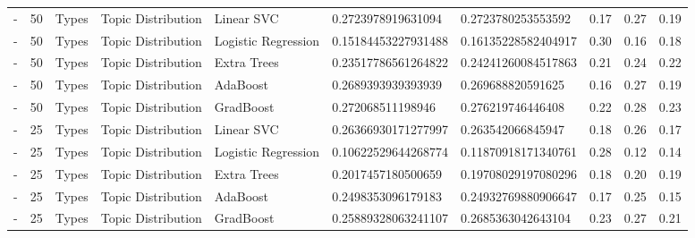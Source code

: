 \begin{table}[]
\begin{tabular}{@{}llllllllll@{}}
    -                   & 50              & Types                 & Topic Distribution    & Linear SVC          & 0.2723978919631094      & 0.2723780253553592     & 0.17               & 0.27            & 0.19              \\
    -                   & 50              & Types                 & Topic Distribution    & Logistic Regression & 0.15184453227931488     & 0.16135228582404917    & 0.30               & 0.16            & 0.18              \\
    -                   & 50              & Types                 & Topic Distribution    & Extra Trees         & 0.23517786561264822     & 0.24241260084517863    & 0.21               & 0.24            & 0.22              \\
    -                   & 50              & Types                 & Topic Distribution    & AdaBoost            & 0.2689393939393939      & 0.269688820591625      & 0.16               & 0.27            & 0.19              \\
    -                   & 50              & Types                 & Topic Distribution    & GradBoost           & 0.272068511198946       & 0.276219746446408      & 0.22               & 0.28            & 0.23              \\
    -                   & 25              & Types                 & Topic Distribution    & Linear SVC          & 0.26366930171277997     & 0.263542066845947      & 0.18               & 0.26            & 0.17              \\
    -                   & 25              & Types                 & Topic Distribution    & Logistic Regression & 0.10622529644268774     & 0.11870918171340761    & 0.28               & 0.12            & 0.14              \\
    -                   & 25              & Types                 & Topic Distribution    & Extra Trees         & 0.2017457180500659      & 0.19708029197080296    & 0.18               & 0.20            & 0.19              \\
    -                   & 25              & Types                 & Topic Distribution    & AdaBoost            & 0.2498353096179183      & 0.24932769880906647    & 0.17               & 0.25            & 0.15              \\
    -                   & 25              & Types                 & Topic Distribution    & GradBoost           & 0.25889328063241107     & 0.2685363042643104     & 0.23               & 0.27            & 0.21              \\

\end{tabular}
\end{table}
